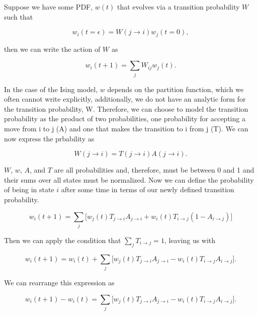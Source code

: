 \documentclass[%
oneside,                 %
final,                   %
10pt]{article}
\begin{document}
Suppose we have some PDF, $w(t)$ that evolves via a transition probability $W$ such that 

\begin{equation*}
w_i(t=\epsilon)=W(j \rightarrow i) w_j(t=0),
\end{equation*}

then we can write the action of $W$ as 

\begin{equation*}
w_i(t+1) = \sum_j W_{ij}w_j(t).
\end{equation*}

In the case of the Ising model, $w$ depends on the partition function, which we often cannot write explicitly, additionally, we do not have an analytic form for the transition probability, W.  Therefore, we can choose to model the transition probability as the product of two probabilities, one probability for accepting a move from i to j (A) and one that makes the transition to i from j (T).  We can now express the prbability as

\begin{equation*}
W(j \rightarrow i) = T( j \rightarrow i) A(j \rightarrow i).
\end{equation*}

$W$, $w$, $A$, and $T$ are all probabilities and, therefore, must be between 0 and 1 and their sums over all states must be normalized.  Now we can define the probability of being in state $i$ after some time in terms of our newly defined transition probability.

\begin{equation*}
w_i(t+1)=\sum_j \lbrack w_j(t)T_{j \rightarrow i}A_{j \rightarrow i} + w_i(t)T_{i \rightarrow j} (1-A_{i \rightarrow j}) \rbrack
\end{equation*}

Then we can apply the condition that $\sum_j T_{i \rightarrow j}=1$, leaving us with

\begin{equation*}
w_i(t+1)= w_i(t) +\sum_j \lbrack w_j(t)T_{j \rightarrow i}A_{j \rightarrow i} - w_i(t)T_{i \rightarrow j}A_{i \rightarrow j} \rbrack.
\end{equation*}

We can rearrange this expression as

\begin{equation*}
w_i(t+1)- w_i(t) = \sum_j \lbrack w_j(t)T_{j \rightarrow i}A_{j \rightarrow i} - w_i(t)T_{i \rightarrow j}A_{i \rightarrow j} \rbrack.
\end{equation*}
\end{document}
